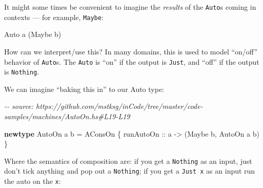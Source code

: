 \documentclass[]{article}
\newenvironment{Shaded}{}{}
\newcommand{\CommentTok}[1]{\textcolor[rgb]{0.38,0.63,0.69}{\textit{#1}}}
\newcommand{\DataTypeTok}[1]{\textcolor[rgb]{0.56,0.13,0.00}{#1}}
\newcommand{\FunctionTok}[1]{\textcolor[rgb]{0.02,0.16,0.49}{#1}}
\newcommand{\KeywordTok}[1]{\textcolor[rgb]{0.00,0.44,0.13}{\textbf{#1}}}
\newcommand{\NormalTok}[1]{#1}
\newcommand{\OperatorTok}[1]{\textcolor[rgb]{0.40,0.40,0.40}{#1}}
\newcommand{\OtherTok}[1]{\textcolor[rgb]{0.00,0.44,0.13}{#1}}
\begin{document}
It might some times be convenient to imagine the \emph{results} of the
\texttt{Auto}s coming in contexts --- for example, \texttt{Maybe}:

\begin{Shaded}
\begin{Highlighting}[]
\DataTypeTok{Auto}\NormalTok{ a (}\DataTypeTok{Maybe}\NormalTok{ b)}
\end{Highlighting}
\end{Shaded}

How can we interpret/use this? In many domains, this is used to model ``on/off''
behavior of \texttt{Auto}s. The \texttt{Auto} is ``on'' if the output is
\texttt{Just}, and ``off'' if the output is \texttt{Nothing}.

We can imagine ``baking this in'' to our Auto type:

\begin{Shaded}
\begin{Highlighting}[]
\CommentTok{{-}{-} source: https://github.com/mstksg/inCode/tree/master/code{-}samples/machines/AutoOn.hs\#L19{-}L19}

\KeywordTok{newtype} \DataTypeTok{AutoOn}\NormalTok{ a b }\OtherTok{=} \DataTypeTok{AConsOn}\NormalTok{ \{}\OtherTok{ runAutoOn ::}\NormalTok{ a }\OtherTok{{-}>}\NormalTok{ (}\DataTypeTok{Maybe}\NormalTok{ b, }\DataTypeTok{AutoOn}\NormalTok{ a b) \}}
\end{Highlighting}
\end{Shaded}

Where the semantics of composition are: if you get a \texttt{Nothing} as an
input, just don't tick anything and pop out a \texttt{Nothing}; if you get a
\texttt{Just\ x} as an input run the auto on the \texttt{x}:

\begin{Shaded}
\end{Shaded}
\end{document}
